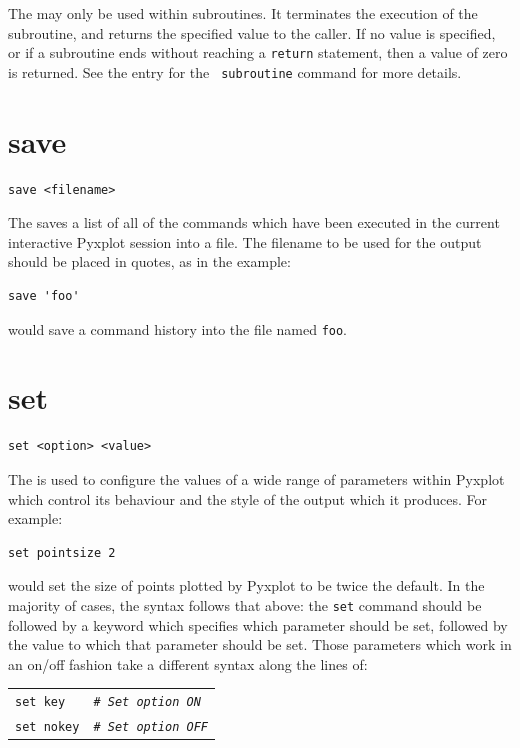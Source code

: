 The  may only be used within subroutines. It terminates the
execution of the subroutine, and returns the specified value to the caller. If
no value is specified, or if a subroutine ends without reaching a {\tt return}
statement, then a value of zero is returned. See the entry for the {\tt
subroutine} command for more details.


\section{save}

\begin{verbatim}
save <filename>
\end{verbatim}

The  saves a list of all of the commands which have been executed
in the current interactive Pyxplot session into a file. The filename to be used
for the output should be placed in quotes, as in the example:

\begin{verbatim}
save 'foo'
\end{verbatim}

\noindent would save a command history into the file named {\tt foo}.


\section{set}

\begin{verbatim}
set <option> <value>
\end{verbatim}

The  is used to configure the values of a wide range of parameters
within Pyxplot which control its behaviour and the style of the output which it
produces.  For example:

\begin{verbatim}
set pointsize 2
\end{verbatim}

\noindent would set the size of points plotted by Pyxplot to be twice the
default. In the majority of cases, the syntax follows that above: the {\tt set}
command should be followed by a keyword which specifies which parameter
should be set, followed by the value to which that parameter should be
set. Those parameters which work in an on/off fashion take a different syntax
along the lines of:

\vspace{3mm}
\begin{tabular}{ll}
{\tt set key} & {\tt\it \# Set option ON} \\
{\tt set nokey} & {\tt\it \# Set option OFF}
\end{tabular}
\vspace{3mm}

